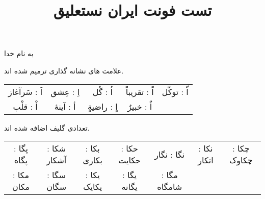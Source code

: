 \documentclass[14pt,a4paper]{article}
\begin{document}
\title{تست فونت ایران نستعلیق}
\author{ }\date{ }

\maketitle

\begin{center}
به نام خدا
\end{center}

علامت های نشانه گذاری ترمیم شده اند.

\vspace{3mm}
\begin{tabular}{c c c c c}
 اَ : سَرآغاز & اِ : عِشق & اُ : گُل & اً : تقریباً & اّ : توکّل \\
  اْ : قلْب & أ : آینهٔ & اٍ : راضیةٍ & اٌ : خبیرٌ & 
\end{tabular}
\vspace{3mm}

تعدادی گلیف اضافه شده اند.

\vspace{3mm}
\begin{tabular}{c c c c c c c}
پگا : پگاه & شکا : آشکار & بکا : بکاری & حکا : حکایت & نگا : نگار & نکا : انکار & چکا : چکاوک \\
مکا : مکان & سگا : سگان & یکا : یکایک & یگا : یگانه & مگا : شامگاه 
\end{tabular}
\vspace{3mm}
\end{document}
